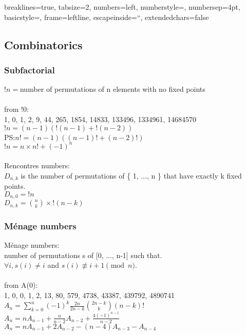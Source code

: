 \lstset
{
breaklines=true,
tabsize=2,
numbers=left,
numberstyle=\sf\scriptsize,
numbersep=4pt,
basicstyle=\sf\scriptsize,
frame=leftline,
escapeinside=``,
extendedchars=false
}

\subsection{Combinatorics}

\subsubsection{Subfactorial}
$!n=$number of permutations of n elements with no fixed points\\
    \\
from !0:\\
1, 0, 1, 2, 9, 44, 265, 1854, 14833, 133496, 1334961, 14684570\\
$!n=(n-1)(!(n-1)+!(n-2))$\\
PS:$n!=(n-1)((n-1)!+(n-2)!)$\\
$!n=n\times n!+(-1)^n$\\
\\
Rencontres numbers:\\
$D_{n,k}$ is the number of permutations of \{ 1, ..., n \} that have exactly k fixed points.\\
$D_{n,0}=!n$\\
$D_{n,k}=\binom{n}{k}\times !(n-k)$\\

\subsubsection{M\'{e}nage numbers}
M\'{e}nage numbers:\\
number of permutations s of [0, ..., n-1] such that.\\
$ \forall i, s(i) \neq i$ and $s(i) \not\equiv i+1 \pmod n$.\\
\\
from A(0):\\
1, 0, 0, 1, 2, 13, 80, 579, 4738, 43387, 439792, 4890741\\

$A_n=\sum\limits_{k=0}^n (-1)^k \frac{2n}{2n-k} {2n-k\choose k} (n-k)!$\\
$A_n = n A_{n-1} + \frac{n}{n-2} A_{n-2} + \frac{4(-1)^{n-1}}{n-2}$\\
$A_n = n A_{n-1} + 2 A_{n-2} - (n-4)A_{n-3} - A_{n-4}$

